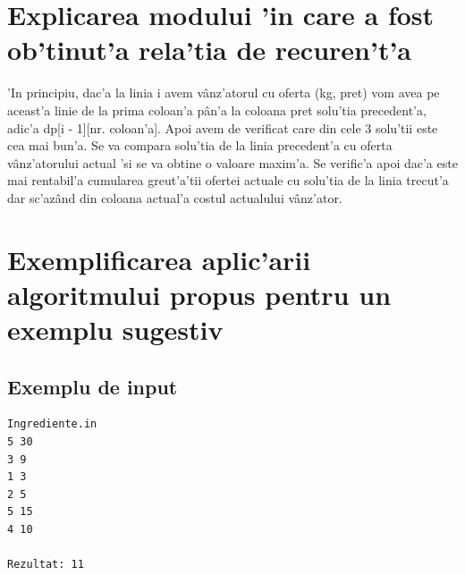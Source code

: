 \vspace{10mm}
\section{Explicarea modului 'in care a fost ob'tinut'a rela'tia de recuren't'a}
\myindent
'In principiu, dac'a la linia i avem v\^anz'atorul cu oferta (kg, pret) vom avea pe aceast'a linie de la prima coloan'a p\^an'a la coloana pret solu'tia precedent'a, adic'a dp[i - 1][nr. coloan'a]. Apoi avem de verificat care din cele 3 solu'tii este cea mai bun'a. Se va compara solu'tia de la linia precedent'a cu oferta v\^anz'atorului actual 'si se va obtine o valoare maxim'a. Se verific'a apoi dac'a este mai rentabil'a cumularea greut'a'tii ofertei actuale cu solu'tia de la linia trecut'a dar sc'az\^and din coloana actual'a costul actualului v\^anz'ator.\\

\vspace{10mm}
\section{Exemplificarea aplic'arii algoritmului propus pentru un exemplu sugestiv}
\subsection{Exemplu de input}
\begin{verbatim}
Ingrediente.in
5 30
3 9
1 3
2 5
5 15
4 10

Rezultat: 11
\end{verbatim}
\newpage
